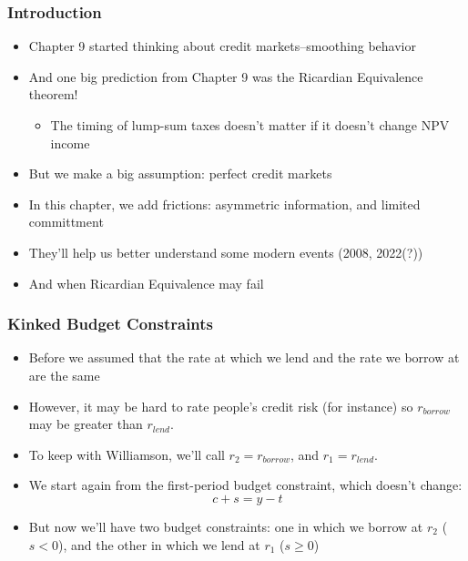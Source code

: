 \documentclass{beamer}
\author{Trevor S. Gallen}
\date{}
\begin{document}
\renewcommand*{\inserttotalframenumber}{\pageref{lastframe}}



\begin{frame}
\titlepage
\end{frame}

\begin{frame}
\frametitle[alignment=center]{Introduction}
\begin{itemize}
\item Chapter 9 started thinking about credit markets--smoothing behavior
\bigskip
\item And one big prediction from Chapter 9 was the Ricardian Equivalence theorem!
\bigskip
\begin{itemize}
\item The timing of lump-sum taxes doesn't matter if it doesn't change NPV income
\end{itemize}
\bigskip
\item But we make a big assumption: perfect credit markets
\bigskip
\item In this chapter, we add frictions: asymmetric information, and limited committment
\bigskip
\item They'll help us better understand some modern events (2008, 2022(?))
\item And when Ricardian Equivalence may fail
\end{itemize}
\end{frame}

\begin{frame}
\frametitle[alignment=center]{Kinked Budget Constraints}
\begin{itemize}
\item Before we assumed that the rate at which we lend and the rate we borrow at are the same
\bigskip
\item However, it may be hard to rate people's credit risk (for instance) so $r_{borrow}$ may be greater than $r_{lend}$.
\bigskip
\item To keep with Williamson, we'll call $r_2=r_{borrow}$, and $r_1=r_{lend}$.
\bigskip
\item We start again from the first-period budget constraint, which doesn't change:
$$c+s=y-t$$
\bigskip
\item But now we'll have two budget constraints: one in which we borrow at $r_2$ ($s<0$), and the other in which we lend at $r_1$ ($s\geq 0$)
\end{itemize}
\end{frame}
\end{document}
